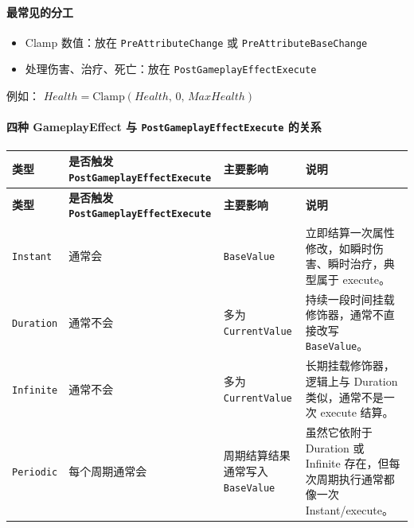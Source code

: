 \paragraph{最常见的分工}
\begin{itemize}
	\item Clamp 数值：放在 \texttt{PreAttributeChange} 或 \texttt{PreAttributeBaseChange}
	\item 处理伤害、治疗、死亡：放在 \texttt{PostGameplayEffectExecute}
\end{itemize}

例如：
$Health = \mathrm{Clamp}(Health,\, 0,\, MaxHealth)
$

\paragraph{四种 GameplayEffect 与 \texttt{PostGameplayEffectExecute} 的关系}
\begin{center}
	\footnotesize
	\begin{longtable}{|p{2cm}|p{3.5cm}|p{3.0cm}|p{4.8cm}|}
		\hline
		\textbf{类型} & \textbf{是否触发 \texttt{PostGameplayEffectExecute}} & \textbf{主要影响} & \textbf{说明} \\
		\hline
		\endfirsthead
		
		\hline
		\textbf{类型} & \textbf{是否触发 \texttt{PostGameplayEffectExecute}} & \textbf{主要影响} & \textbf{说明} \\
		\hline
		\endhead
		
		\hline
		\endfoot
		
		\hline
		\endlastfoot
		
		\texttt{Instant}
		& 通常会
		& \texttt{BaseValue}
		& 立即结算一次属性修改，如瞬时伤害、瞬时治疗，典型属于 execute。 \\
		\hline
		
		\texttt{Duration}
		& 通常不会
		& 多为 \texttt{CurrentValue}
		& 持续一段时间挂载修饰器，通常不直接改写 \texttt{BaseValue}。 \\
		\hline
		
		\texttt{Infinite}
		& 通常不会
		& 多为 \texttt{CurrentValue}
		& 长期挂载修饰器，逻辑上与 Duration 类似，通常不是一次 execute 结算。 \\
		\hline
		
		\texttt{Periodic}
		& 每个周期通常会
		& 周期结算结果通常写入 \texttt{BaseValue}
		& 虽然它依附于 Duration 或 Infinite 存在，但每次周期执行通常都像一次 Instant/execute。 \\
		\hline
		
	\end{longtable}
\end{center}

